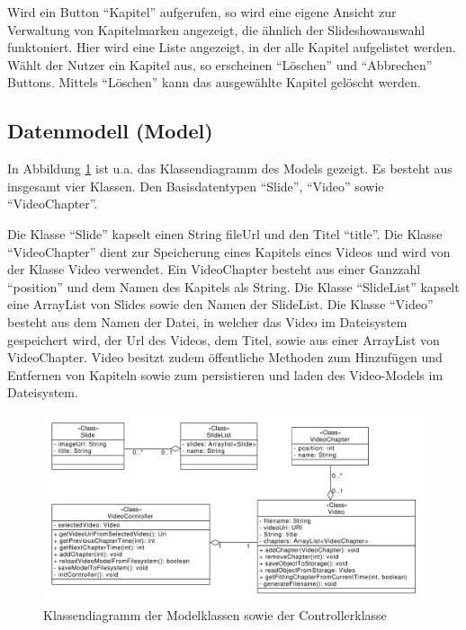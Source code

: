Wird ein Button \enquote{Kapitel} aufgerufen, so wird eine eigene Ansicht zur Verwaltung von Kapitelmarken angezeigt, die ähnlich der Slideshowauswahl funktoniert. Hier wird eine Liste angezeigt, in der alle Kapitel aufgelistet werden. Wählt der Nutzer ein Kapitel aus, so erscheinen \enquote{Löschen} und \enquote{Abbrechen} Buttons. Mittels \enquote{Löschen} kann das ausgewählte Kapitel gelöscht werden. 
%
%
\subsection{Datenmodell (Model)}
In Abbildung \ref{fig:Klassendiagramm} ist u.a. das Klassendiagramm des Models gezeigt. Es besteht aus insgesamt vier Klassen. Den Basisdatentypen \enquote{Slide}, \enquote{Video} sowie \enquote{VideoChapter}. 

Die Klasse \enquote{Slide} kapselt einen String fileUrl und den Titel \enquote{title}. 
Die Klasse \enquote{VideoChapter} dient zur Speicherung eines Kapitels eines Videos und wird von der Klasse Video verwendet. Ein VideoChapter besteht aus einer Ganzzahl \enquote{position} und dem Namen des Kapitels als String. 
Die Klasse \enquote{SlideList} kapselt eine ArrayList von Slides sowie den Namen der SlideList.
Die Klasse \enquote{Video} besteht aus dem Namen der Datei, in welcher das Video im Dateisystem gespeichert wird, der Url des Videos, dem Titel, sowie aus einer ArrayList von VideoChapter. Video besitzt zudem öffentliche Methoden zum Hinzufügen und Entfernen von Kapiteln sowie zum persistieren und laden des Video-Models im Dateisystem.
\begin{figure}[htbp]
    \centering
    \includegraphics[width=1\textwidth]{data/bilder/Klassendiagramm.pdf}
    \caption{Klassendiagramm der Modelklassen sowie der Controllerklasse}
    \label{fig:Klassendiagramm}
\end{figure}
%
%
